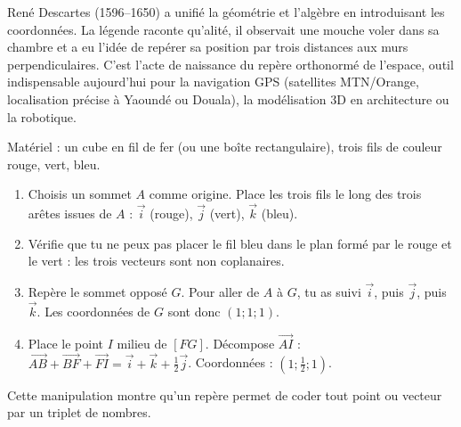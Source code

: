 \documentclass[11pt]{article}
\newcommand{\cle}[1]{{\popxbold\color{popdark}#1}}
\begin{document}
\begin{savaistu}
René Descartes (1596--1650) a unifié la géométrie et l'algèbre en introduisant les coordonnées. La légende raconte qu'alité, il observait une mouche voler dans sa chambre et a eu l'idée de repérer sa position par trois distances aux murs perpendiculaires. C'est l'acte de naissance du repère orthonormé de l'espace, outil indispensable aujourd'hui pour la navigation GPS (satellites MTN/Orange, localisation précise à Yaoundé ou Douala), la modélisation 3D en architecture ou la robotique.
\end{savaistu}

\begin{experience}
Matériel : un cube en fil de fer (ou une boîte rectangulaire), trois fils de couleur rouge, vert, bleu.
\begin{enumerate}
\item Choisis un sommet $A$ comme origine. Place les trois fils le long des trois arêtes issues de $A$ : $\vec{i}$ (rouge), $\vec{j}$ (vert), $\vec{k}$ (bleu).
\item Vérifie que tu ne peux pas placer le fil bleu dans le plan formé par le rouge et le vert : les trois vecteurs sont \cle{non coplanaires}.
\item Repère le sommet opposé $G$. Pour aller de $A$ à $G$, tu as suivi $\vec{i}$, puis $\vec{j}$, puis $\vec{k}$. Les coordonnées de $G$ sont donc $(1;1;1)$.
\item Place le point $I$ milieu de $[FG]$. Décompose $\overrightarrow{AI}$ : $\overrightarrow{AB}+\overrightarrow{BF}+\overrightarrow{FI} = \vec{i}+\vec{k}+\frac{1}{2}\vec{j}$. Coordonnées : $(1;\frac{1}{2};1)$.
\end{enumerate}
Cette manipulation montre qu'un repère permet de coder tout point ou vecteur par un triplet de nombres.
\end{experience}
\end{document}
